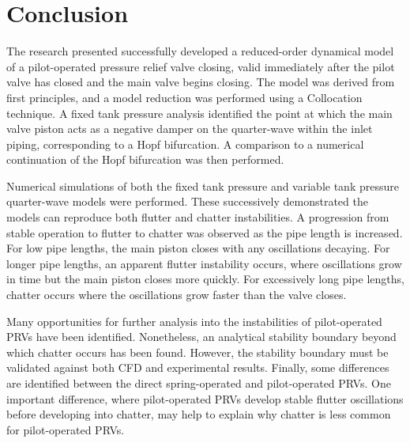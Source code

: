 \chapter{Conclusion}

The research presented successfully developed a reduced-order dynamical model of a pilot-operated pressure relief valve closing, valid immediately after the pilot valve has closed and the main valve begins closing. The model was derived from first principles, and a model reduction was performed using a Collocation technique. A fixed tank pressure analysis identified the point at which the main valve piston acts as a negative damper on the quarter-wave within the inlet piping, corresponding to a Hopf bifurcation. A comparison to a numerical continuation of the Hopf bifurcation was then performed.

Numerical simulations of both the fixed tank pressure and variable tank pressure quarter-wave models were performed. These successively demonstrated the models can reproduce both flutter and chatter instabilities. A progression from stable operation to flutter to chatter was observed as the pipe length is increased. For low pipe lengths, the main piston closes with any oscillations decaying. For longer pipe lengths, an apparent flutter instability occurs, where oscillations grow in time but the main piston closes more quickly. For excessively long pipe lengths, chatter occurs where the oscillations grow faster than the valve closes.

Many opportunities for further analysis into the instabilities of pilot-operated PRVs have been identified. Nonetheless, an analytical stability boundary beyond which chatter occurs has been found. However, the stability boundary must be validated against both CFD and experimental results. Finally, some differences are identified between the direct spring-operated and pilot-operated PRVs. One important difference, where pilot-operated PRVs develop stable flutter oscillations before developing into chatter, may help to explain why chatter is less common for pilot-operated PRVs.